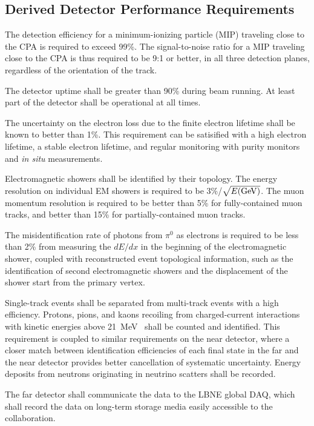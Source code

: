 \subsection{Derived Detector Performance Requirements}

The detection efficiency for a minimum-ionizing particle (MIP)
traveling close to the CPA is required to exceed 99\%.  The
signal-to-noise ratio for a MIP traveling close to the CPA is thus
required to be 9:1 or better, in all three detection planes,
regardless of the orientation of the track.

The detector uptime shall be greater than 90\% during beam running.
At least part of the detector shall be operational at all times.

The uncertainty on the electron loss due to the finite electron
lifetime shall be known to better than 1\%.  This requirement can be
satisified with a high electron lifetime, a stable electron lifetime,
and regular monitoring with purity monitors and {\it in situ}
measurements.

Electromagnetic showers shall be identified by their topology.  The
energy resolution on individual EM showers is required to be
3\%/$\sqrt{E({\rm GeV})}$.  The muon momentum resolution is required
to be better than 5\% for fully-contained muon tracks, and better than
15\% for partially-contained muon tracks.

The misidentification rate of photons from $\pi^0$ as electrons is
required to be less than 2\% from measuring the $dE/dx$ in the
beginning of the electromagnetic shower, coupled with reconstructed
event topological information, such as the identification of second
electromagnetic showers and the displacement of the shower start from
the primary vertex.

Single-track events shall be separated from multi-track events with a
high efficiency.  Protons, pions, and kaons recoiling from 
charged-current interactions with kinetic energies above
21~MeV~\cite{argoneut_proton_spectra} shall be counted and
identified.  This requirement is coupled to similar requirements on the near detector,
where a closer match between identification efficiencies of each final state in the far
and the near detector provides better cancellation of systematic uncertainty.
Energy deposits from neutrons
originating in neutrino scatters shall be recorded.

The far detector shall communicate the data to the LBNE global DAQ,
which shall record the data on long-term storage media easily
accessible to the collaboration.

